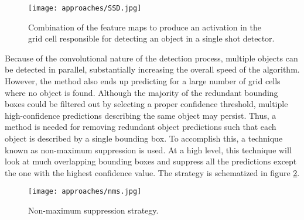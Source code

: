 \begin{figure}[h]
	\caption{Combination of the feature maps to produce an activation in the grid cell responsible for detecting an object in a single shot detector.}
	\centering
	\texttt{[image: approaches/SSD.jpg]}
	\label{fig:ssd}
\end{figure}

Because of the convolutional nature of the detection process, multiple objects can be detected in parallel, substantially increasing the overall speed of the algorithm. However, the method also ends up predicting for a large number of grid cells where no object is found. Although the majority of the redundant bounding boxes could be filtered out by selecting a proper confidence threshold, multiple high-confidence predictions describing the same object may persist. Thus, a method is needed for removing redundant object predictions such that each object is described by a single bounding box. To accomplish this, a technique known as non-maximum suppression is used. At a high level, this technique will look at much overlapping bounding boxes and suppress all the predictions except the one with the highest confidence value. The strategy is schematized in figure \ref{fig:nms}.

\begin{figure}[h]
	\caption{Non-maximum suppression strategy.}
	\centering
	\texttt{[image: approaches/nms.jpg]}
	\label{fig:nms}
\end{figure}

